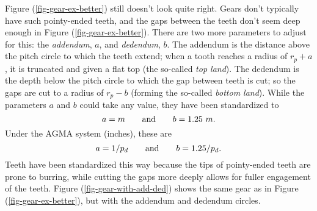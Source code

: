 \documentclass[10pt]{article}
\begin{document}
Figure (\ref{fig-gear-ex-better}) still doesn't look quite
right. Gears don't typically have such pointy-ended teeth, and the gaps
between the teeth don't seem deep enough in Figure
(\ref{fig-gear-ex-better}). There are two more parameters to adjust
for this: the \emph{addendum}, $a$, and \emph{dedendum}, $b$. The
addendum is the distance above the pitch circle to which the teeth
extend; when a tooth reaches a radius of $r_p + a$, it is truncated
and given a flat top (the so-called \emph{top land}). The dedendum is
the depth below the pitch circle to which the gap between teeth is
cut; so the gaps are cut to a radius of $r_p -b$ (forming the
so-called \emph{bottom land}). While the parameters $a$ and $b$ could
take any value, they have been standardized to
$$a = m\qquad{\rm and}\qquad b = 1.25\ m.$$
Under the AGMA system (inches), these are
$$a = 1/p_d\qquad{\rm and}\qquad b = 1.25/p_d.$$
Teeth have been standardized this way because the tips of pointy-ended
teeth are prone to burring, while cutting the gaps more deeply allows
for fuller engagement of the teeth. Figure (\ref{fig-gear-with-add-ded})
shows the same gear as in Figure (\ref{fig-gear-ex-better}), but with
the addendum and dedendum circles.
\end{document}
